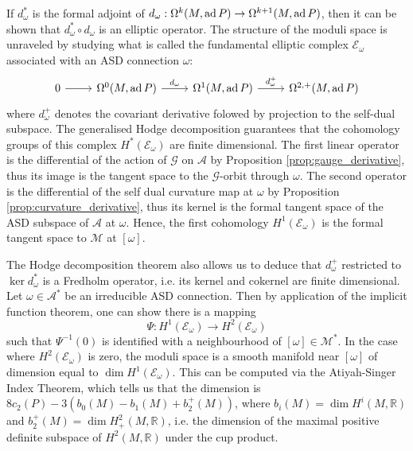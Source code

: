 If $d^*_\omega$ is the formal adjoint of $d_\omega : \Omega^k(M,\operatorname{ad} P) \to
\Omega^{k+1}(M,\operatorname{ad} P)$, then it can be shown that $d^*_\omega \circ d_\omega$ is
an elliptic operator. 
The structure of the moduli space is unraveled by studying what is called the
fundamental elliptic complex $\mathcal{E}_\omega$ associated with an ASD 
connection $\omega$:
\[
\begin{tikzcd}
	0 \arrow[r] &\Omega^0(M,\ad P) \arrow[r,"d_\omega"] 
				&\Omega^1(M,\ad P) \arrow[r,"d^+_\omega"] &\Omega^{2,+}(M,\ad P)
\end{tikzcd} 
\]
where $d_\omega^+$ denotes the covariant derivative folowed by projection to the 
self-dual subspace.
The generalised Hodge decomposition guarantees that the cohomology groups of this
complex $H^*(\mathcal{E}_\omega)$ are finite dimensional. 
The first linear operator is the differential of the action of $\mathcal{G}$ on
$\mathcal{A}$ by Proposition \ref{prop:gauge_derivative}, thus its image is
the tangent space to the $\mathcal{G}$-orbit through $\omega$. The second
operator is the differential of the self dual curvature map at  $\omega$ by
Proposition \ref{prop:curvature_derivative}, thus
its kernel is the formal tangent space of the ASD subspace of $\mathcal{A}$ 
at $\omega$. 
Hence, the first cohomology $H^1(\mathcal{E}_\omega)$ is the formal tangent
space to $\mathcal{M}$ at $[\omega]$.

\begin{comment}
It also gives us an orthogonal decomposition 
\[ %
\Omega^1(M,\ad P) = \Im(d_\omega) \oplus \ker(d^*_\omega)
\] 
$\Im(d_\omega)$ is the tangent space to the orbit $\omega \cdot \mathcal{G}$ at
$\omega$. 
If $\omega$ is irreducible, there is a sufficiently small neighbourhood of 
$\omega$ in  $\ker(d^*_\omega)$ (thought of as a subset of connections)
which intersects an orbit no more than once, so projects injectively into the
moduli space. So it provides a local model for the moduli space.
\end{comment}

The Hodge decomposition theorem also allows us to deduce that $d_\omega^+$
restricted to $\ker d_\omega^*$ is a
Fredholm operator, i.e. its kernel and cokernel are finite dimensional. 
Let $\omega\in \mathcal{A}^*$ be an irreducible ASD connection. 
Then by application of the implicit function theorem, one can show
there is a mapping 
\[
\Psi : H^1(\mathcal{E}_\omega) \to H^2(\mathcal{E}_\omega)
\] 
such that $\Psi^{-1}(0)$ is identified with a
neighbourhood of $[\omega] \in \mathcal{M}^*$. In the case where 
$H^2(\mathcal{E}_\omega)$ is zero, the moduli space is a smooth manifold near
$[\omega]$ of dimension equal to  $\dim H^1(\mathcal{E}_\omega)$. This can be
computed via the Atiyah-Singer Index Theorem, which tells us that 
the dimension is $8c_2(P) - 3(b_0(M) - b_1(M) + b_2^+(M))$, where $b_i(M)=\dim
H^i(M,\mathbb{R})$ and  $b_2^+(M)=\dim H^2_+(M,\mathbb{R})$, i.e. the 
dimension of the maximal positive definite
subspace of $H^2(M,\mathbb{R})$ under the cup product.

